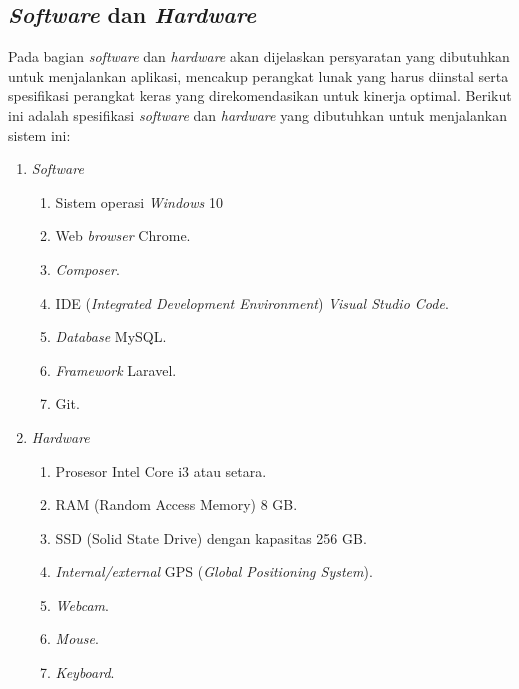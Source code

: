 \subsection{\textit{Software} dan \textit{Hardware}}
Pada bagian \textit{software} dan \textit{hardware} akan dijelaskan persyaratan yang dibutuhkan untuk menjalankan aplikasi, mencakup perangkat lunak yang harus diinstal serta spesifikasi perangkat keras yang direkomendasikan untuk kinerja optimal. Berikut ini adalah spesifikasi \textit{software} dan \textit{hardware} yang dibutuhkan untuk menjalankan sistem ini:
\begin{enumerate}
    \item \textit{Software}
    \begin{enumerate}
        \item Sistem operasi \textit{Windows} 10
        \item Web \textit{browser} Chrome.
        \item \textit{Composer}.
        \item IDE (\textit{Integrated Development Environment}) \textit{Visual Studio Code}.
        \item \textit{Database} MySQL.
        \item \textit{Framework} Laravel.   
        \item Git.
        
    \end{enumerate}
    \item \textit{Hardware}
	      \begin{enumerate}
                    \item Prosesor Intel Core i3 atau setara.
    	    	\item RAM (Random Access Memory) 8 GB.
    	      	\item SSD (Solid State Drive) dengan kapasitas 256 GB.
                    \item \textit{Internal/external} GPS (\textit{Global Positioning System}).
                    \item \textit{Webcam}.
    	      	\item \textit{Mouse}.
    	      	\item \textit{Keyboard}.
             \end{enumerate}
    \end{enumerate}

